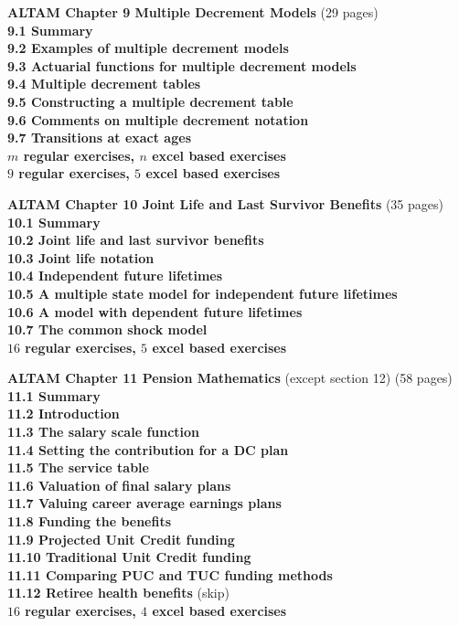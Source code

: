 \documentclass[hidelinks, 12pt]{article}
\theoremstyle{mydefstyle}
\theoremstyle{mythmstyle}
\begin{document}
\textbf{ALTAM Chapter 9 Multiple Decrement Models} (29 pages) \\
\textbf{9.1 Summary} \\
\textbf{9.2 Examples of multiple decrement models} \\
\textbf{9.3 Actuarial functions for multiple decrement models} \\
\textbf{9.4 Multiple decrement tables} \\
\textbf{9.5 Constructing a multiple decrement table} \\
\textbf{9.6 Comments on multiple decrement notation} \\
\textbf{9.7 Transitions at exact ages} \\
\textbf{$m$ regular exercises, $n$ excel based exercises} \\
\textbf{$9$ regular exercises, $5$ excel based exercises}

\textbf{ALTAM Chapter 10 Joint Life and Last Survivor Benefits} (35 pages) \\
\textbf{10.1 Summary} \\
\textbf{10.2 Joint life and last survivor benefits} \\
\textbf{10.3 Joint life notation} \\
\textbf{10.4 Independent future lifetimes} \\
\textbf{10.5 A multiple state model for independent future lifetimes} \\
\textbf{10.6 A model with dependent future lifetimes} \\
\textbf{10.7 The common shock model} \\
\textbf{$16$ regular exercises, $5$ excel based exercises}

\textbf{ALTAM Chapter 11 Pension Mathematics} (except section 12) (58 pages) \\
\textbf{11.1 Summary} \\
\textbf{11.2 Introduction} \\
\textbf{11.3 The salary scale function} \\
\textbf{11.4 Setting the contribution for a DC plan} \\
\textbf{11.5 The service table} \\
\textbf{11.6 Valuation of final salary plans} \\
\textbf{11.7 Valuing career average earnings plans} \\
\textbf{11.8 Funding the benefits} \\
\textbf{11.9 Projected Unit Credit funding} \\
\textbf{11.10 Traditional Unit Credit funding} \\
\textbf{11.11 Comparing PUC and TUC funding methods} \\
\textbf{11.12 Retiree health benefits} (skip) \\
\textbf{$16$ regular exercises, $4$ excel based exercises}
\end{document}

